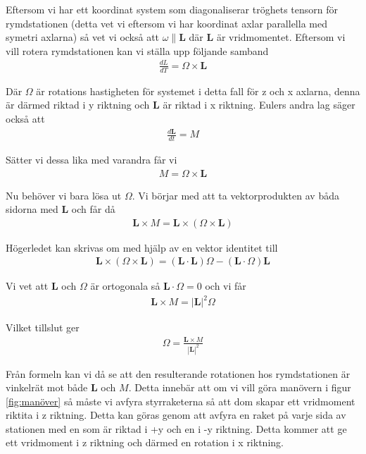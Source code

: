 \documentclass[a4paper]{article}
\begin{document}
Eftersom vi har ett koordinat system som diagonaliserar tröghets tensorn för rymdstationen (detta vet vi eftersom vi har koordinat axlar parallella med symetri axlarna) så vet vi också att $\omega \parallel \mathbf{L}$ där $\mathbf{L}$ är vridmomentet. Eftersom vi vill rotera rymdstationen kan vi ställa upp följande samband
\begin{align*}
    \frac{dL}{dT} = \Omega \times \mathbf{L}
\end{align*}

Där $\Omega$ är rotations hastigheten för systemet i detta fall för z och x axlarna, denna är därmed riktad i y riktning och $\mathbf{L}$ är riktad i x riktning. Eulers andra lag säger också att
\begin{align*}
    \frac{d\mathbf{L}}{dt} = M
\end{align*}

Sätter vi dessa lika med varandra får vi
\begin{align*}
    M = \Omega \times \mathbf{L}
\end{align*}

Nu behöver vi bara lösa ut $\Omega$. Vi börjar med att ta vektorprodukten av båda sidorna med $\mathbf{L}$ och får då
\begin{align*}
    \mathbf{L} \times M = \mathbf{L} \times (\Omega \times \mathbf{L})
\end{align*}

Högerledet kan skrivas om med hjälp av en vektor identitet till 
\begin{align*}
    \mathbf{L} \times (\Omega \times \mathbf{L}) = (\mathbf{L} \cdot \mathbf{L})\Omega - (\mathbf{L} \cdot \Omega)\mathbf{L}
\end{align*}

Vi vet att $\mathbf{L}$ och $\Omega$ är ortogonala så $\mathbf{L} \cdot \Omega = 0$ och vi får
\begin{align*}
    \mathbf{L} \times M = |\mathbf{L}|^2\Omega
\end{align*}

Vilket tillslut ger
\begin{align*}
    \Omega = \frac{\mathbf{L} \times M}{|\mathbf{L}|^2}
\end{align*}

Från formeln kan vi då se att den resulterande rotationen hos rymdstationen är vinkelrät mot både $\mathbf{L}$ och $M$. Detta innebär att om vi vill göra manövern i figur \ref{fig:manöver} så måste vi avfyra styrraketerna så att dom skapar ett vridmoment riktita i z riktning. Detta kan göras genom att avfyra en raket på varje sida av stationen med en som är riktad i +y och en i -y riktning. Detta kommer att ge ett vridmoment i z riktning och därmed en rotation i x riktning. 
\end{document}
